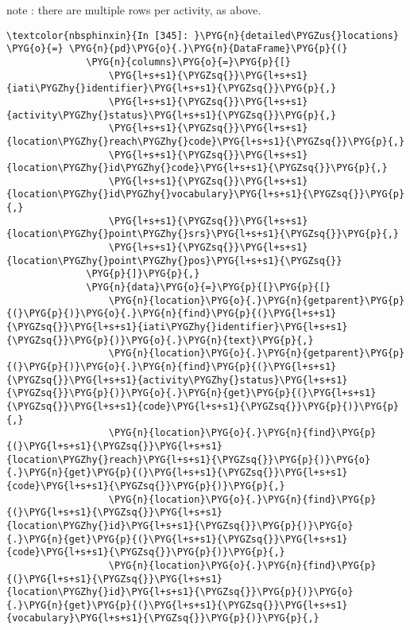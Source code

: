 \documentclass[letterpaper,10pt,english]{sphinxmanual}
\newenvironment{notice}{\begin{sphinxadmonition}}{\end{sphinxadmonition}}%
\begin{document}
\begin{notice}{note}{}\unskip
{}: there are multiple rows per activity, as above.
\end{notice}

\begin{Verbatim}[commandchars=\\\{\}]
\textcolor{nbsphinxin}{In [345]: }\PYG{n}{detailed\PYGZus{}locations} \PYG{o}{=} \PYG{n}{pd}\PYG{o}{.}\PYG{n}{DataFrame}\PYG{p}{(}
              \PYG{n}{columns}\PYG{o}{=}\PYG{p}{[}
                  \PYG{l+s+s1}{\PYGZsq{}}\PYG{l+s+s1}{iati\PYGZhy{}identifier}\PYG{l+s+s1}{\PYGZsq{}}\PYG{p}{,}
                  \PYG{l+s+s1}{\PYGZsq{}}\PYG{l+s+s1}{activity\PYGZhy{}status}\PYG{l+s+s1}{\PYGZsq{}}\PYG{p}{,}
                  \PYG{l+s+s1}{\PYGZsq{}}\PYG{l+s+s1}{location\PYGZhy{}reach\PYGZhy{}code}\PYG{l+s+s1}{\PYGZsq{}}\PYG{p}{,}
                  \PYG{l+s+s1}{\PYGZsq{}}\PYG{l+s+s1}{location\PYGZhy{}id\PYGZhy{}code}\PYG{l+s+s1}{\PYGZsq{}}\PYG{p}{,}
                  \PYG{l+s+s1}{\PYGZsq{}}\PYG{l+s+s1}{location\PYGZhy{}id\PYGZhy{}vocabulary}\PYG{l+s+s1}{\PYGZsq{}}\PYG{p}{,}
                  \PYG{l+s+s1}{\PYGZsq{}}\PYG{l+s+s1}{location\PYGZhy{}point\PYGZhy{}srs}\PYG{l+s+s1}{\PYGZsq{}}\PYG{p}{,}
                  \PYG{l+s+s1}{\PYGZsq{}}\PYG{l+s+s1}{location\PYGZhy{}point\PYGZhy{}pos}\PYG{l+s+s1}{\PYGZsq{}}
              \PYG{p}{]}\PYG{p}{,}
              \PYG{n}{data}\PYG{o}{=}\PYG{p}{[}\PYG{p}{[}
                  \PYG{n}{location}\PYG{o}{.}\PYG{n}{getparent}\PYG{p}{(}\PYG{p}{)}\PYG{o}{.}\PYG{n}{find}\PYG{p}{(}\PYG{l+s+s1}{\PYGZsq{}}\PYG{l+s+s1}{iati\PYGZhy{}identifier}\PYG{l+s+s1}{\PYGZsq{}}\PYG{p}{)}\PYG{o}{.}\PYG{n}{text}\PYG{p}{,}
                  \PYG{n}{location}\PYG{o}{.}\PYG{n}{getparent}\PYG{p}{(}\PYG{p}{)}\PYG{o}{.}\PYG{n}{find}\PYG{p}{(}\PYG{l+s+s1}{\PYGZsq{}}\PYG{l+s+s1}{activity\PYGZhy{}status}\PYG{l+s+s1}{\PYGZsq{}}\PYG{p}{)}\PYG{o}{.}\PYG{n}{get}\PYG{p}{(}\PYG{l+s+s1}{\PYGZsq{}}\PYG{l+s+s1}{code}\PYG{l+s+s1}{\PYGZsq{}}\PYG{p}{)}\PYG{p}{,}
                  \PYG{n}{location}\PYG{o}{.}\PYG{n}{find}\PYG{p}{(}\PYG{l+s+s1}{\PYGZsq{}}\PYG{l+s+s1}{location\PYGZhy{}reach}\PYG{l+s+s1}{\PYGZsq{}}\PYG{p}{)}\PYG{o}{.}\PYG{n}{get}\PYG{p}{(}\PYG{l+s+s1}{\PYGZsq{}}\PYG{l+s+s1}{code}\PYG{l+s+s1}{\PYGZsq{}}\PYG{p}{)}\PYG{p}{,}
                  \PYG{n}{location}\PYG{o}{.}\PYG{n}{find}\PYG{p}{(}\PYG{l+s+s1}{\PYGZsq{}}\PYG{l+s+s1}{location\PYGZhy{}id}\PYG{l+s+s1}{\PYGZsq{}}\PYG{p}{)}\PYG{o}{.}\PYG{n}{get}\PYG{p}{(}\PYG{l+s+s1}{\PYGZsq{}}\PYG{l+s+s1}{code}\PYG{l+s+s1}{\PYGZsq{}}\PYG{p}{)}\PYG{p}{,}
                  \PYG{n}{location}\PYG{o}{.}\PYG{n}{find}\PYG{p}{(}\PYG{l+s+s1}{\PYGZsq{}}\PYG{l+s+s1}{location\PYGZhy{}id}\PYG{l+s+s1}{\PYGZsq{}}\PYG{p}{)}\PYG{o}{.}\PYG{n}{get}\PYG{p}{(}\PYG{l+s+s1}{\PYGZsq{}}\PYG{l+s+s1}{vocabulary}\PYG{l+s+s1}{\PYGZsq{}}\PYG{p}{)}\PYG{p}{,}

\end{Verbatim}
\end{document}

